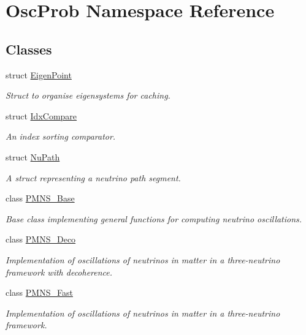 \hypertarget{namespaceOscProb}{}\section{Osc\+Prob Namespace Reference}
\label{namespaceOscProb}
\subsection*{Classes}
\begin{DoxyCompactItemize}
\item 
struct \hyperlink{structOscProb_1_1EigenPoint}{Eigen\+Point}
\begin{DoxyCompactList}\small\item\em Struct to organise eigensystems for caching. \end{DoxyCompactList}\item 
struct \hyperlink{structOscProb_1_1IdxCompare}{Idx\+Compare}
\begin{DoxyCompactList}\small\item\em An index sorting comparator. \end{DoxyCompactList}\item 
struct \hyperlink{structOscProb_1_1NuPath}{Nu\+Path}
\begin{DoxyCompactList}\small\item\em A struct representing a neutrino path segment. \end{DoxyCompactList}\item 
class \hyperlink{classOscProb_1_1PMNS__Base}{P\+M\+N\+S\+\_\+\+Base}
\begin{DoxyCompactList}\small\item\em Base class implementing general functions for computing neutrino oscillations. \end{DoxyCompactList}\item 
class \hyperlink{classOscProb_1_1PMNS__Deco}{P\+M\+N\+S\+\_\+\+Deco}
\begin{DoxyCompactList}\small\item\em Implementation of oscillations of neutrinos in matter in a three-\/neutrino framework with decoherence. \end{DoxyCompactList}\item 
class \hyperlink{classOscProb_1_1PMNS__Fast}{P\+M\+N\+S\+\_\+\+Fast}
\begin{DoxyCompactList}\small\item\em Implementation of oscillations of neutrinos in matter in a three-\/neutrino framework. \end{DoxyCompactList}\item 

\end{DoxyCompactItemize}
